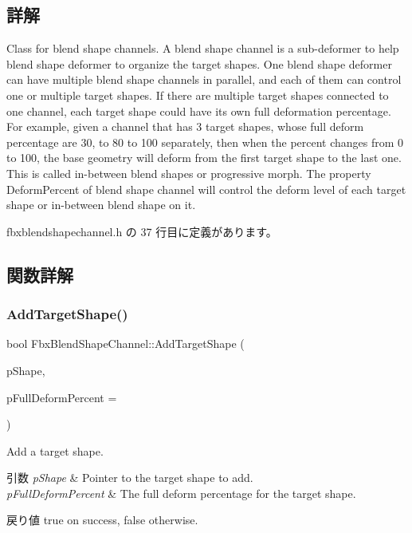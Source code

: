 \subsection{詳解}
Class for blend shape channels. A blend shape channel is a sub-\/deformer to help blend shape deformer to organize the target shapes. One blend shape deformer can have multiple blend shape channels in parallel, and each of them can control one or multiple target shapes. If there are multiple target shapes connected to one channel, each target shape could have its own full deformation percentage. For example, given a channel that has 3 target shapes, whose full deform percentage are 30, to 80 to 100 separately, then when the percent changes from 0 to 100, the base geometry will deform from the first target shape to the last one. This is called in-\/between blend shapes or progressive morph. The property Deform\+Percent of blend shape channel will control the deform level of each target shape or in-\/between blend shape on it. 

 fbxblendshapechannel.\+h の 37 行目に定義があります。



\subsection{関数詳解}
\mbox{\label{class_fbx_blend_shape_channel_aa09d012a7304dd2098ebd2a066d53dde}} 
\subsubsection{\texorpdfstring{Add\+Target\+Shape()}{AddTargetShape()}}
{\footnotesize\ttfamily bool Fbx\+Blend\+Shape\+Channel\+::\+Add\+Target\+Shape (\begin{DoxyParamCaption}\item[{\hyperlink{class_fbx_shape}{Fbx\+Shape} $\ast$}]{p\+Shape,  }\item[{double}]{p\+Full\+Deform\+Percent = {} }\end{DoxyParamCaption})}

Add a target shape. 
\begin{DoxyParams}{引数}
{\em p\+Shape} & Pointer to the target shape to add. \\
\hline
{\em p\+Full\+Deform\+Percent} & The full deform percentage for the target shape. \\
\hline
\end{DoxyParams}
\begin{DoxyReturn}{戻り値}
{\ttfamily true} on success, {\ttfamily false} otherwise. 
\end{DoxyReturn}
\mbox{\label{class_fbx_blend_shape_channel_a37993d2cccb4376edb241577ccbd061f}} 

